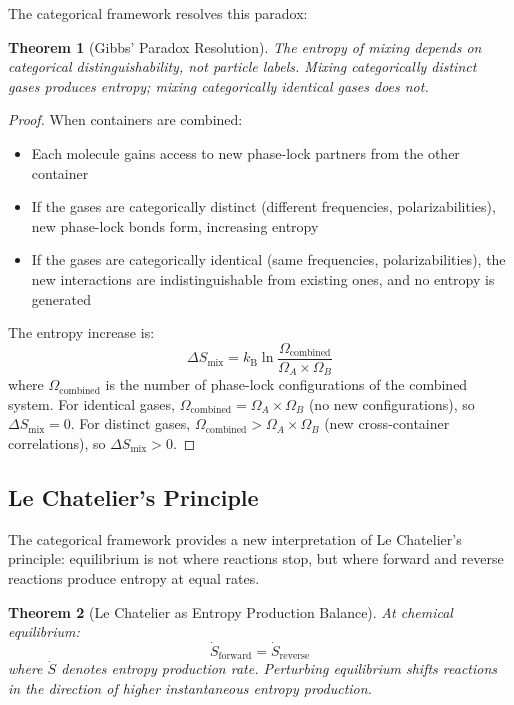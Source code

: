 \documentclass[twocolumn,showpacs,preprintnumbers,amsmath,amssymb,prd]{revtex4-2}
\newtheorem{theorem}{Theorem}[section]
\theoremstyle{definition}
\theoremstyle{remark}
\newcommand{\kB}{k_{\mathrm{B}}}
\begin{document}
The categorical framework resolves this paradox:

\begin{theorem}[Gibbs' Paradox Resolution]
\label{thm:gibbs}
The entropy of mixing depends on categorical distinguishability, not particle labels. Mixing categorically distinct gases produces entropy; mixing categorically identical gases does not.
\end{theorem}

\begin{proof}
When containers are combined:
\begin{itemize}
\item Each molecule gains access to new phase-lock partners from the other container
\item If the gases are categorically distinct (different frequencies, polarizabilities), new phase-lock bonds form, increasing entropy
\item If the gases are categorically identical (same frequencies, polarizabilities), the new interactions are indistinguishable from existing ones, and no entropy is generated
\end{itemize}

The entropy increase is:
\begin{equation}
\Delta S_{\text{mix}} = \kB \ln \frac{\Omega_{\text{combined}}}{\Omega_A \times \Omega_B}
\end{equation}
where $\Omega_{\text{combined}}$ is the number of phase-lock configurations of the combined system. For identical gases, $\Omega_{\text{combined}} = \Omega_A \times \Omega_B$ (no new configurations), so $\Delta S_{\text{mix}} = 0$. For distinct gases, $\Omega_{\text{combined}} > \Omega_A \times \Omega_B$ (new cross-container correlations), so $\Delta S_{\text{mix}} > 0$.
\end{proof}

\subsection{Le Chatelier's Principle}

The categorical framework provides a new interpretation of Le Chatelier's principle: equilibrium is not where reactions stop, but where forward and reverse reactions produce entropy at equal rates.

\begin{theorem}[Le Chatelier as Entropy Production Balance]
\label{thm:lechatelier}
At chemical equilibrium:
\begin{equation}
\dot{S}_{\text{forward}} = \dot{S}_{\text{reverse}}
\end{equation}
where $\dot{S}$ denotes entropy production rate. Perturbing equilibrium shifts reactions in the direction of higher instantaneous entropy production.
\end{theorem}
\end{document}

